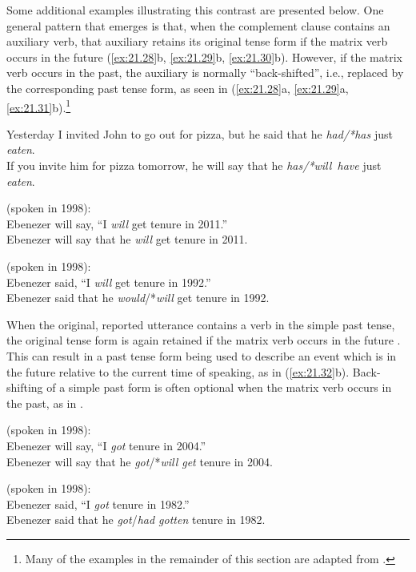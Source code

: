 Some additional examples illustrating this contrast are presented below. One general pattern that emerges is that, when the complement clause contains an auxiliary verb, that auxiliary retains its original tense form if the matrix verb occurs in the future (\ref{ex:21.28}b, \ref{ex:21.29}b, \ref{ex:21.30}b). However, if the matrix verb occurs in the past, the auxiliary is normally “back-shifted”, i.e., replaced by the corresponding past tense form, as seen in (\ref{ex:21.28}a, \ref{ex:21.29}a, \ref{ex:21.31}b).\footnote{Many of the examples in the remainder of this section are adapted from \citet{Declerck1991}.}


\ea \label{ex:21.29}
\ea  Yesterday I invited John to go out for pizza, but he said that he \textit{had/*has} just \textit{eaten}.\\
\ex If you invite him for pizza tomorrow, he will say that he \textit{has/*will~have} just \textit{eaten}.
                       \z
\z


\ea \label{ex:21.30}
(spoken in 1998):\\
 Ebenezer will say, “I \textit{will} get tenure in 2011.”\\
 Ebenezer will say that he \textit{will} get tenure in 2011.
                       \z
\z

\ea \label{ex:21.31}
(spoken in 1998):\\
 Ebenezer said, “I \textit{will} get tenure in 1992.”\\
 Ebenezer said that he \textit{would}/*\textit{will} get tenure in 1992.
                       \z
\z


When the original, reported utterance contains a verb in the simple past tense, the original tense form is again retained if the matrix verb occurs in the future . This can result in a past tense form being used to describe an event which is in the future relative to the current time of speaking, as in (\ref{ex:21.32}b). Back-shifting of a simple past form is often optional when the matrix verb occurs in the past, as in .


\ea \label{ex:21.32}
(spoken in 1998):\\
 Ebenezer will say, “I \textit{got} tenure in 2004.”\\
 Ebenezer will say that he \textit{got}/*\textit{will get} tenure in 2004.
                       \z
\z

\ea \label{ex:21.33}
(spoken in 1998):\\
 Ebenezer said, “I \textit{got} tenure in 1982.”\\
 Ebenezer said that he \textit{got}/\textit{had gotten} tenure in 1982.
                       \z
\z


